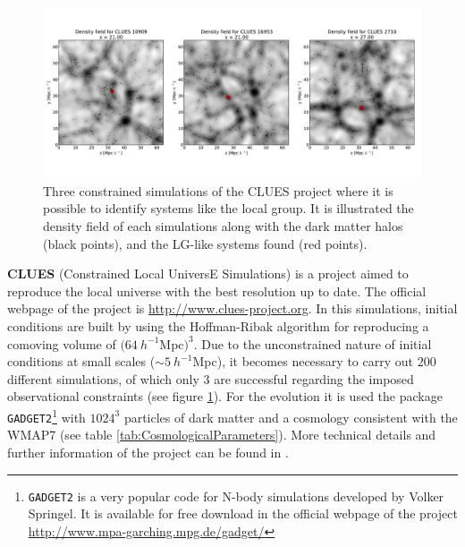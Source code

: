 \begin{figure}[htbp]
	\centering
	\includegraphics[width=1.0\textwidth]
	{./figures/3_nbody_simulations/CLUES_Simulations.pdf}

	\caption{\small{Three constrained simulations of the CLUES project 
	where it is possible to identify systems like the local group. It is
	illustrated the density field of each simulations along with the dark
	matter halos (black points), and the LG-like systems found (red 
	points).}}
	
	\label{fig:CLUES_Right}
\end{figure}


\textbf{CLUES} (Constrained Local UniversE Simulations) is a project aimed
to reproduce the local universe with the best resolution up to date. The 
official webpage of the project is \url{http://www.clues-project.org}. In 
this simulations, initial conditions are built by using the Hoffman-Ribak
algorithm \cite{Hoffman1991} for reproducing a comoving volume of $(64\ 
h^{-1}$Mpc$)^{3}$. Due to the unconstrained nature of initial conditions at
small scales ($\sim 5\ h^{-1}$Mpc), it becomes necessary to carry out $200$
different simulations, of which only $3$ are successful regarding the 
imposed observational constraints (see figure \ref{fig:CLUES_Right}).
For the evolution it is used the package \texttt{GADGET2}\footnote{
\texttt{GADGET2} is a very popular code for N-body simulations developed
by Volker Springel. It is available for free download in the official 
webpage of the project \url{http://www.mpa-garching.mpg.de/gadget/}}
with $1024^3$ particles of dark matter and a cosmology consistent with
the WMAP7 (see table \ref{tab:CosmologicalParameters}). More technical 
details  and further information of the project can be found in
\cite{Gottloeber2010}.


